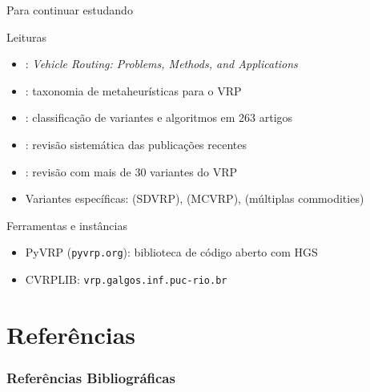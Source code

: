 \documentclass[aspectratio=169,xcolor=table]{beamer}
\begin{document}
\begin{frame}{Para continuar estudando}
  \begin{block}{Leituras}
    \begin{itemize}
      \item {}: \emph{Vehicle Routing: Problems, Methods, and Applications}
      \item {}: taxonomia de metaheurísticas para o VRP
      \item {}: classificação de variantes e algoritmos em 263 artigos
      \item {}: revisão sistemática das publicações recentes
      \item {}: revisão com mais de 30 variantes do VRP
      \item Variantes específicas:  (SDVRP),  (MCVRP),  (múltiplas commodities)
    \end{itemize}
  \end{block}
  \vspace{0.5em}
  \begin{block}{Ferramentas e instâncias}
    \begin{itemize}
      \item PyVRP (\texttt{pyvrp.org}): biblioteca de código aberto com HGS
      \item CVRPLIB: \texttt{vrp.galgos.inf.puc-rio.br}
    \end{itemize}
  \end{block}
\end{frame}

\section*{Referências}
\begin{frame}[allowframebreaks]
  \frametitle{Referências Bibliográficas}
  {\footnotesize
    
  }
\end{frame}

\begin{frame}
  \titlepage
\end{frame}
\end{document}
